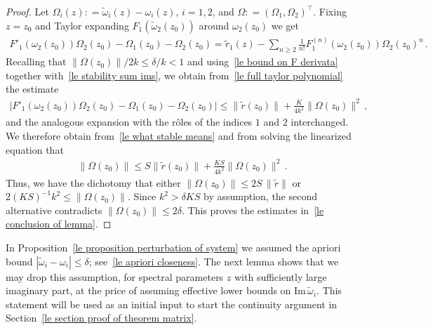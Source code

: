 \documentclass[10pt,reqno]{amsart}
\numberwithin{equation}{section}
\theoremstyle{plain}
\numberwithin{kevin}{section}
\theoremstyle{remark}
\newcommand{\im}{\mathrm{Im}\,}
\newcommand{\deq}{\mathrel{\mathop:}=}
\begin{document}
\begin{proof}
 
Let $\Omega_{i}(z)\deq\widetilde\omega_i(z)-\omega_i(z)$, $i=1,2$, and $\Omega\deq(\Omega_1,\Omega_2)^\top$. Fixing $z=z_0$ and Taylor expanding $F_1(\widetilde\omega_2(z_0))$ around $\omega_2(z_0)$ we get
\begin{align}\label{le full taylor polynomial}
 F'_1(\omega_2(z_0))\Omega_2(z_0)-\Omega_1(z_0)-\Omega_2(z_0)=\widetilde{r}_1(z)-\sum_{n\ge 2}\frac{1}{n!}F^{(n)}_1(\omega_2(z_0))\Omega_2(z_0)^n\,.
\end{align}
Recalling that $\|\Omega(z_0)\|/2k\le \delta/k<1$ and using~\eqref{le bound on F derivata} together with~\eqref{le stability sum ims}, we obtain from~\eqref{le full taylor polynomial} the estimate
\begin{align}\label{le full expansion of GammaA}
 \left| F'_1(\omega_2(z_0))\Omega_2(z_0)-\Omega_1(z_0)-\Omega_2(z_0)\right|\le \|\widetilde r(z_0)\|+ \frac{K}{4 k^{2}}\|\Omega(z_0)\|^2\,,
\end{align}
and the analogous expansion with the r\^{o}les of the indices $1$ and $2$ interchanged. We therefore obtain from~\eqref{le what stable means} and from solving the linearized equation that
\begin{align}
 \|\Omega(z_0)\|\le S \|\widetilde r(z_0)\|+\frac{KS}{4 k^{2}}\|\Omega(z_0)\|^2\,.
\end{align}
Thus, we have the dichotomy that either $ \|\Omega(z_0)\|\le 2 S\,\|\widetilde r\|$ or $2(KS)^{-1}k^{2}\le   \|\Omega(z_0)\|$. Since $k^2>\delta KS$ by assumption, the second alternative contradicts $\|\Omega(z_0)\|\le 2\delta$. This proves the estimates in~\eqref{le conclusion of lemma}.\qedhere
\end{proof}



In Proposition~\ref{le proposition perturbation of system} we assumed the apriori bound $|\widetilde\omega_i-\omega_i|\le \delta$; see~\eqref{le apriori closeness}. The next lemma shows that we may drop this assumption, for spectral parameters $z$ with sufficiently large imaginary part, at the price of assuming effective lower bounds on $\im \widetilde\omega_i$. This statement will be used as an initial input to start the continuity argument
in Section~\ref{le section proof of theorem matrix}.
\end{document}
